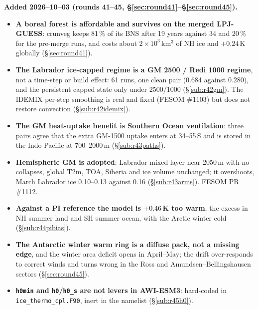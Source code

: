 \documentclass[10pt]{article}
\begin{document}
\textbf{Added 2026--10--03 (rounds 41--45, \S\ref{sec:round41}--\S\ref{sec:round45}).}
\begin{itemize}\itemsep2pt
\item \textbf{A boreal forest is affordable and survives on the merged LPJ-GUESS}: crunveg keeps
81\,\% of its BNS after 19 years against 34 and 20\,\% for the pre-merge runs, and costs about
$2\times10^3$\,km$^3$ of NH ice and $+0.24$\,K globally (\S\ref{sec:round41}).
\item \textbf{The Labrador ice-capped regime is a GM 2500 / Redi 1000 regime}, not a time-step or
build effect: 61 runs, one clean pair (0.684 against 0.280), and the persistent capped state only
under 2500/1000 (\S\ref{sub:r42gm}). The IDEMIX per-step smoothing is real and fixed
(FESOM \#1103) but does not restore convection (\S\ref{sub:r42idemix}).
\item \textbf{The GM heat-uptake benefit is Southern Ocean ventilation}: three pairs agree that the
extra GM-1500 uptake enters at 34--55\,S and is stored in the Indo-Pacific at 700--2000\,m
(\S\ref{sub:r43paths}).
\item \textbf{Hemispheric GM is adopted}: Labrador mixed layer near 2050\,m with no collapses,
global T2m, TOA, Siberia and ice volume unchanged; it overshoots, March Labrador ice 0.10--0.13
against 0.16 (\S\ref{sub:r43arms}). FESOM PR \#1112.
\item \textbf{Against a PI reference the model is $+0.46$\,K too warm}, the excess in NH summer
land and SH summer ocean, with the Arctic winter cold (\S\ref{sub:r44pibias}).
\item \textbf{The Antarctic winter warm ring is a diffuse pack, not a missing edge}, and the winter
area deficit opens in April--May; the drift over-responds to correct winds and turns wrong in the
Ross and Amundsen--Bellingshausen sectors (\S\ref{sec:round45}).
\item \textbf{\texttt{h0min} and \texttt{h0}/\texttt{h0\_s} are not levers in AWI-ESM3}: hard-coded
in \texttt{ice\_thermo\_cpl.F90}, inert in the namelist (\S\ref{sub:r45h0}).
\end{itemize}
\end{document}

